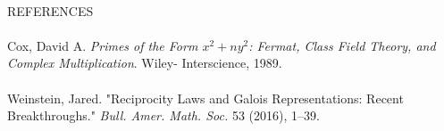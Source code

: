\documentclass[12pt]{article}
\begin{document}
\paragraph{} REFERENCES

\paragraph{} Cox, David A. \textit{Primes of the Form $x^2 + ny^2$:
Fermat, Class Field Theory, and Complex Multiplication}. Wiley-
Interscience, 1989.
\paragraph{} Weinstein, Jared. "Reciprocity Laws and Galois
Representations: Recent Breakthroughs." \textit{Bull. Amer. Math.
Soc.} 53 (2016), 1--39.

\end{document}
